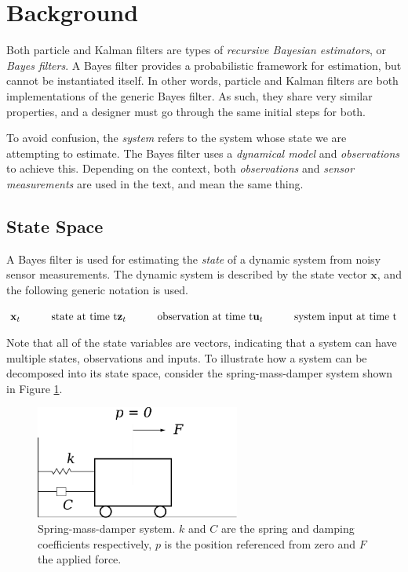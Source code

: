 \section{Background}\label{sec:background}

Both particle and Kalman filters are types of \emph{recursive Bayesian estimators},
or \emph{Bayes filters}. A Bayes filter provides a probabilistic framework
for estimation, but cannot be instantiated itself. In other words,
particle and Kalman filters are both implementations of the generic Bayes filter.
As such, they share very similar properties, and a designer must go through the
same initial steps for both.

To avoid confusion, the \emph{system} refers to the system whose state we are
attempting to estimate. The Bayes filter uses a \emph{dynamical model} and
\emph{observations} to achieve this. Depending on the context, both
\emph{observations} and \emph{sensor measurements} are used in the text, and
mean the same thing.

\subsection{State Space}\label{sec:state-space}
A Bayes filter is used for estimating the \emph{state} of a dynamic system from
noisy sensor measurements. The dynamic system is described by the state
vector $\textbf{x}$, and the following generic notation is used.

\begin{math}
\mathbf{x}_{t}\quad\quad\quad\textrm{state at time t} \\
\mathbf{z}_{t}\quad\quad\quad\textrm{observation at time t} \\
\mathbf{u}_{t}\quad\quad\quad\textrm{system input at time t}
\end{math}

Note that all of the state variables are vectors, indicating that a system can
have multiple states, observations and inputs. To illustrate how a system can be
decomposed into its state space, consider the spring-mass-damper system shown in
Figure \ref{fig:spring-mass-damper}.

\begin{figure}[h]
\centering
\includegraphics[width=0.6\textwidth]{images/cart-system}
\caption{Spring-mass-damper system. $k$ and $C$ are the spring and damping
    coefficients respectively, $p$ is the position referenced from zero and $F$
    the applied force.
}
\label{fig:spring-mass-damper}
\end{figure}

